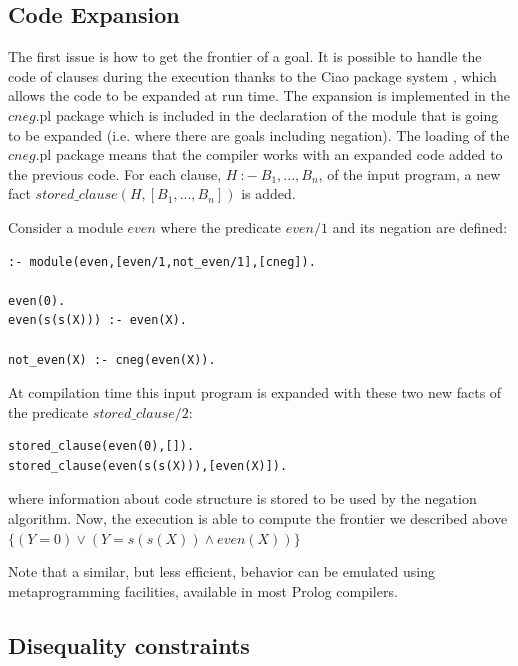 \documentclass{tlp}
\begin{document}

\subsection{Code Expansion}
\label{expansion}

The first issue is how to get the frontier of a goal. It is possible to handle
the code of clauses during the execution thanks to the Ciao package system
\cite{ciao-modules-cl2000}, which allows the code to be expanded at run
time. The expansion is implemented in the $cneg$.pl package which is included
in the declaration of the module that is going to be expanded (i.e. where
there are goals including negation). The loading of the $cneg$.pl package
means that the compiler works with an expanded code added to the previous
code. For each clause, $H~:-~B_1,...,B_n$, of the input program, a new fact
$stored\_clause(H,[B_1,...,B_n])$ is added.

Consider a module $even$ where the predicate $even/1$ and its negation are
defined: 

\begin{verbatim}
:- module(even,[even/1,not_even/1],[cneg]).

even(0).
even(s(s(X))) :- even(X).

not_even(X) :- cneg(even(X)).
\end{verbatim}

At compilation time this input program is expanded with these two new facts of
the predicate $stored\_clause/2$:  

\begin{verbatim}
stored_clause(even(0),[]).
stored_clause(even(s(s(X))),[even(X)]).
\end{verbatim}

\noindent
where information about code structure is stored to be used by the negation
algorithm. Now, the execution is able to compute the frontier we described
above $\{ ( Y=0 ) \vee ( Y=s(s(X)) \wedge even(X) ) \}$

Note that a similar, but less efficient, behavior can be emulated
using metaprogramming facilities, available in most Prolog compilers.
 

\subsection{Disequality constraints}
\label{disequality}
\end{document}

